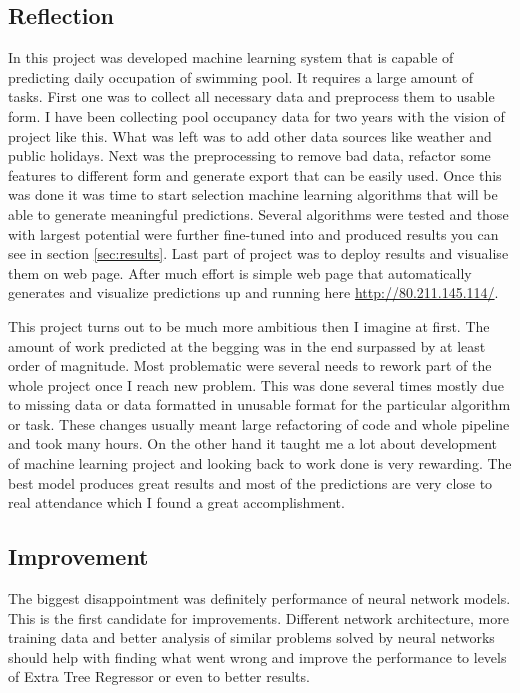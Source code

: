 \documentclass{article}
\begin{document}
\subsection{Reflection}
In this project was developed machine learning system that is capable of predicting daily occupation of swimming pool. It requires a large amount of tasks. First one was to collect all necessary data and preprocess them to usable form. I have been collecting pool occupancy data for two years with the vision of project like this. What was left was to add other data sources like weather and public holidays. Next was the preprocessing to remove bad data, refactor some features to different form and generate export that can be easily used. Once this was done it was time to start selection machine learning algorithms that will be able to generate meaningful predictions. Several algorithms were tested and those with largest potential were further fine-tuned into and produced results you can see in section \ref{sec:results}. Last part of project was to deploy results and visualise them on web page. After much effort is simple web page that automatically generates and visualize predictions up and running here \href{http://80.211.145.114/}{http://80.211.145.114/}.

This project turns out to be much more ambitious then I imagine at first. The amount of work predicted at the begging was in the end surpassed by at least order of magnitude. Most problematic were several needs to rework part of the whole project once I reach new problem. This was done several times mostly due to missing data or data formatted in unusable format for the particular algorithm or task. These changes usually meant large refactoring of code and whole pipeline and took many hours. On the other hand it taught me a lot about development of machine learning project and looking back to work done is very rewarding. The best model produces great results and most of the predictions are very close to real attendance which I found a great accomplishment.

\subsection{Improvement}
The biggest disappointment was definitely performance of neural network models. This is the first candidate for improvements. Different network architecture, more training data and better analysis of similar problems solved by neural networks should help with finding what went wrong and improve the performance to levels of Extra Tree Regressor or even to better results.
\end{document}
